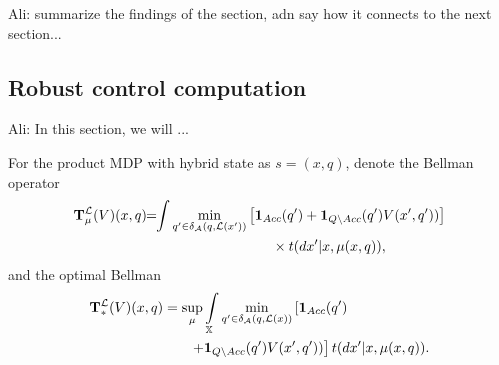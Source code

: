 \documentclass{ifacconf}
\newcommand{\red}[1]{{\color{red} #1}}
\renewcommand{\axx}[1]{{\color{orange} Ali: #1}}
\begin{document}
% 
% 
%

\axx{summarize the findings of the section, adn say how it connects to the next section...}

\subsection{Robust control computation}
\axx{In this section, we will ...
}

\red{For the product MDP with hybrid state as $s=(x, q)$, denote the Bellman operator}
\begin{align}\label{eq:V_recopt_inf}
& \Bel_\pol^\Labset (V)(x,q) \!\!=\!\!\int%
\min_{q' \in \delta_\FSA(q, \Labset( x'))}\left[\mathbf 1_{Acc}(q')+  \mathbf 1_{Q\setminus Acc}(q')V( x',q'))\right]\notag\\&\hspace{5cm}\hfill \times{\tr}(d x'|x,\pol(x,q)),
\end{align}
and the optimal Bellman 
\begin{align}\label{eq:V_recopt_inf}
& \Bel_\ast^\Labset (V)(x,q) =\sup_\pol\int_{\X}\min_{ q' \in \delta_\FSA(q, \Labset(\bar x))}\left[\mathbf 1_{Acc}( q')\right.\hspace{1.5cm}\\&\left.\hspace{2.5cm}+  \mathbf 1_{Q\setminus Acc}( q')V( x', q'))\right]\notag {\tr}(d x'
|x,\pol(x,q)).
\end{align}
\end{document}
